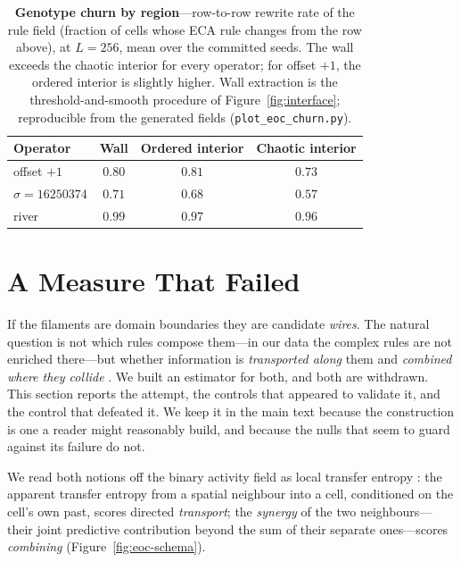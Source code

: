 \documentclass[man,12pt,floatsintext,donotrepeattitle]{apa7}
\begin{document}
\begin{table}[tb]
\centering
\caption{\textbf{Genotype churn by region}---row-to-row rewrite rate of the rule
field (fraction of cells whose ECA rule changes from the row above), at
$L = 256$, mean over the committed seeds. The wall exceeds the chaotic
interior for every operator; for offset $+1$, the ordered interior is slightly
higher. Wall extraction is the threshold-and-smooth procedure of
Figure~\ref{fig:interface}; reproducible from the generated fields
(\texttt{plot\_eoc\_churn.py}).}
\label{tab:churn}
\begin{tabular}{lccc}
\toprule
Operator & Wall & Ordered interior & Chaotic interior \\
\midrule
offset $+1$          & $0.80$ & $0.81$ & $0.73$ \\
$\sigma = 16250374$  & $0.71$ & $0.68$ & $0.57$ \\
river                & $0.99$ & $0.97$ & $0.96$ \\
\bottomrule
\end{tabular}
\end{table}


\section{A Measure That Failed}
\label{sec:eoc-compute}

If the filaments are domain boundaries they are candidate \emph{wires}. The
natural question is not which rules compose them---in our data the complex rules
are not enriched there---but whether information is \emph{transported along}
them and \emph{combined where they collide} \parencite{mitchell1993revisiting}.
We built an estimator for both, and both are withdrawn. This section reports the
attempt, the controls that appeared to validate it, and the control that
defeated it. We keep it in the main text because the construction is one a
reader might reasonably build, and because the nulls that seem to guard against
its failure do not.

We read both notions off the binary activity field as local transfer entropy
\parencite{lizier2008local}: the apparent transfer entropy from a spatial
neighbour into a cell, conditioned on the cell's own past, scores directed
\emph{transport}; the \emph{synergy} of the two neighbours---their joint
predictive contribution beyond the sum of their separate ones---scores
\emph{combining} (Figure~\ref{fig:eoc-schema}).
\end{document}
